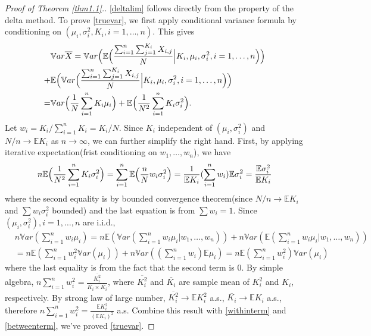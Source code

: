 \documentclass[10pt]{article}
\newcommand{\var}{\ensuremath{\mathbb Var}}
\newcommand{\bbe}{\mathbb{E}}
\newcommand{\xbar}{\overline{X}}
\begin{document}
\begin{proof}[Proof of Theorem \ref{thm1.1}.]
\eqref{deltalim} follows directly from the property of the delta method. To prove \eqref{truevar}, we first apply conditional variance formula by conditioning on $(\mu_i,\sigma_i^2, K_i, i=1,\dots,n)$. This gives
\begin{align*}
&\var \xbar =  \var  \Bigl( \bbe\Bigl(   \frac{\sum_{i=1}^n\sum_{j=1}^{K_i} X_{i,j}}{N} \Big| K_i,\mu_i,\sigma_i^2,  i=1,\dots,n\Bigr) \Bigr) \\
+&\bbe \Bigl(\var \Bigl( \frac{\sum_{i=1}^n\sum_{j=1}^{K_i} X_{i,j}}{N} \Big | K_i,\mu_i,\sigma_i^2,  i=1,\dots,n\Bigr)\Bigr) \notag\\
=&\var \Bigl(\frac{1}{N}\sum_{i=1}^n K_i \mu_i \Bigr)+\bbe \Bigl(\frac{1}{N^2}\sum_{i=1}^n K_i \sigma^2_i \Bigr).
\end{align*}
Let  $w_i = K_i/\sum_{i=1}^n K_i = K_i/N$. Since $K_i$ independent of $(\mu_i, \sigma^2_i)$ and $N/n \to \bbe {K_i}$ as $n\to \infty$, we can further simplify the right hand. First, by applying iterative expectation(frist conditioning on $w_1,\dots, w_n$), we have  
\begin{align}
n \bbe \Bigl(\frac{1}{N^2}\sum_{i=1}^n K_i \sigma^2_i \Bigr)  = \sum_{i=1}^n \bbe\Bigl( \frac{n}{N} w_i\sigma^2_i \Bigr) = \frac{1}{\bbe K_i}(\sum_{i=1}^n w_i)\bbe \sigma_i^2 = \frac{\bbe \sigma_i^2}{\bbe K_i} \label{withinterm}
\end{align}
where the second equality is by bounded convergence theorem(since $N/n \to \bbe {K_i}$ and $\sum w_i\sigma^2_i$ bounded) and the last equation is from $\sum w_i=1$. Since $(\mu_i, \sigma^2_i), {i=1,\dots, n}$ are i.i.d., 
\begin{align}
&n\var (\sum_{i=1}^n w_i \mu_i) = n\bbe (\var (\sum_{i=1}^n w_i \mu_i|w_1,\dots,w_n))+ n\var (\bbe (\sum_{i=1}^n w_i \mu_i|w_1,\dots,w_n)) \\
&=  n\bbe (\sum_{i=1}^n w_i^2 \var(\mu_i)) + n \var((\sum_{i=1}^n w_i)\bbe\mu_i ) = n\bbe(\sum_{i=1}^n w_i^2) \var (\mu_i) \label {betweenterm}
\end{align}
where the last equality is from the fact that the second term is $0$. By simple algebra, 
$n \sum_{i=1}^n w_i^2 =  \frac{\overline{K_i^2}}{\overline{K_i} \times \overline{K_i}}$, where $\overline{K_i^2}$ and $\overline{K_i}$ are sample mean of $K_i^2$ and $K_i$, respectively.
By strong law of large number, $\overline{K_i^2}\to \bbe K_i^2$ a.s., $\overline{K_i}\to \bbe K_i$ a.s., therefore $n \sum_{i=1}^n w_i^2 =  \frac{\bbe{K_i^2}}{(\bbe{K_i})^2}$ a.s. Combine this result with \eqref{withinterm} and \eqref{betweenterm}, we've proved \eqref{truevar}.


\end{proof}
\end{document}

